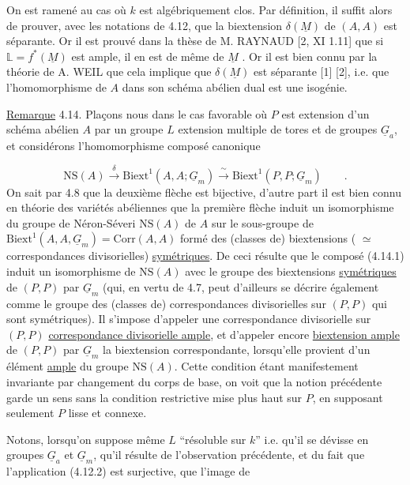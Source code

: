 On est ramené au cas où $k$ est algébriquement clos. Par définition, il suffit alors de prouver, avec les notations de 4.12, que la biextension $\delta(\underline{M})$ de $(A,A)$ est séparante. Or il est prouvé dans la thèse de M. RAYNAUD [2, XI 1.11] que si $\mathbb{L} = f^{*}(\underline{M})$ est ample, il en est de même de $\underline{M}$ . Or il est bien connu par la théorie de A. WEIL que cela implique que $\delta(\underline{M})$ est séparante [1] [2], i.e. que l'homomorphisme de $A$ dans son schéma abélien dual est une isogénie.

\underline{Remarque} 4.14. Plaçons nous dans le cas favorable où $P$ est extension d'un schéma abélien $A$ par un groupe $L$ extension multiple de tores et de groupes $\underline{G}_{a}$, et considérons l'homomorphisme composé canonique 



\begin{equation}\tag{4.14.1}
 \mathrm{NS}(A) \xrightarrow{\ \delta\ } \mathrm{Biext}^{1}(A,A;\underline{G}_{m}) \xrightarrow{\ \sim\ } \mathrm{Biext}^{1}(P,P;\underline{G}_{m}) \qquad .
\end{equation}
On sait par 4.8 que la deuxième flèche est bijective, d'autre part il est bien connu en théorie des variétés abéliennes que la première flèche induit un isomorphisme du groupe de Néron-Séveri $\mathrm{NS}(A)$ de $A$ sur le sous-groupe de $\mathrm{Biext}^{1}(A,A,\underline{G}_{m}) = \mathrm{Corr}(A,A)$ formé des (classes de) biextensions ( $\simeq$ correspondances divisorielles) \underline{symétriques}. De ceci résulte que le composé (4.14.1) induit un isomorphisme de $\mathrm{NS}(A)$ avec le groupe des biextensions \underline{symétriques} de $(P,P)$ par $\underline{G}_{m}$ (qui, en vertu de 4.7, peut d'ailleurs se décrire également comme le groupe des (classes de) correspondances divisorielles sur $(P,P)$ qui sont symétriques). Il s'impose d'appeler une correspondance divisorielle sur $(P,P)$ \underline{correspondance divisorielle ample}, et d'appeler encore \underline{biextension ample} de $(P,P)$ par $\underline{G}_{m}$ la biextension correspondante, lorsqu'elle provient d'un élément \underline{ample} du groupe $\mathrm{NS}(A)$. Cette condition étant manifestement invariante par changement du corps de base, on voit que la notion précédente garde un sens sans la condition restrictive mise plus haut sur $P$, en supposant seulement $P$ lisse et connexe.

Notons, lorsqu'on suppose même $L$ ``résoluble sur $k$'' i.e. qu'il se dévisse en groupes $\underline{G}_{a}$ et $\underline{G}_{m}$, qu'il résulte de l'observation précédente, et du fait que l'application (4.12.2) est surjective, que l'image de

